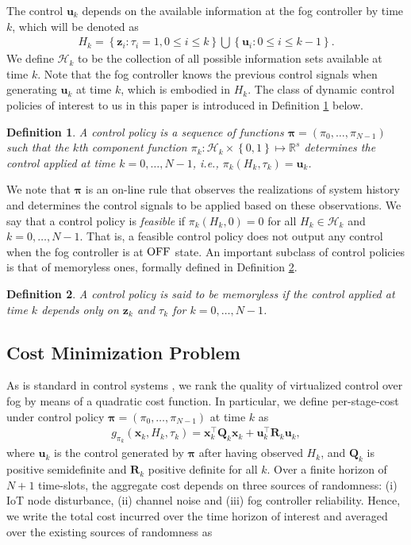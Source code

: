 \documentclass[10pt, journal, letterpaper]{IEEEtran}
\newcommand{\paren}[1]{\left(#1\right)}
\newcommand{\brparen}[1]{\left\{#1\right\}}
\newcommand{\field}[1]{\ensuremath{\mathbb{#1}}}
\newcommand{\R}{\ensuremath{\field{R}}} %
\newcommand{\1}{\ensuremath{\mathbf{1}}} %
\newcommand{\off}{\ensuremath{{\rm OFF}}}
\newcommand{\hist}{\ensuremath{{\mathcal{H}}}}
\renewcommand{\vec}[1]{\ensuremath{\boldsymbol{#1}}} %
\newtheorem{definition}{Definition}
\begin{document}
The control $\vec{u}_k$ depends on the available information at the fog controller by time $k$, which will be denoted as
\begin{eqnarray}
H_k = \brparen{\vec{z}_i: \tau_i = 1,  0 \leq i \leq k} \bigcup \brparen{\vec{u}_i: 0 \leq i \leq k-1}. \label{Eqn: System History}
\end{eqnarray}
We define $\hist_k$ to be the collection of all possible information sets available at time $k$. Note that the fog controller knows the previous control signals when generating $\vec{u}_k$ at time $k$, which is embodied in $H_k$. The class of dynamic control policies of interest to us in this paper is introduced in Definition \ref{Def: Control Policy} below.
\begin{definition} \label{Def: Control Policy}
A control policy is a sequence of functions $\vec{\pi} = \paren{\pi_0, \ldots, \pi_{N-1}}$ such that the $k$th component function $\pi_k: \hist_k \times \brparen{0, 1} \mapsto \R^s$ determines the control applied at time $k = 0, \ldots, N-1$, i.e., $\pi_k\paren{H_k, \tau_k} = \vec{u}_k$.
\end{definition}

We note that $\vec{\pi}$ is an on-line rule that observes the realizations of system history and determines the control signals to be applied based on these observations. We say that a control policy is {\em feasible} if $\pi_k\paren{H_k, 0} = 0$ for all $H_k \in \hist_k$ and $k=0, \ldots, N-1$.  That is, a feasible control policy does not output any control when the fog controller is at $\off$ state. An important subclass of control policies is that of memoryless ones, formally defined in Definition \ref{Def: Memoryless Control}.

\begin{definition} \label{Def: Memoryless Control}
A control policy is said to be {\em memoryless} if the control applied at time $k$ depends only on $\vec{z}_k$ and $\tau_k$ for $k=0, \ldots, N-1$.
\end{definition}

\subsection{Cost Minimization Problem}
As is standard in control systems \cite{Pappas15, Gupta07, Yuksel06, Yuksel13, Tatikonda04}, we rank the quality of virtualized control over fog by means of a quadratic cost function. In particular, we define per-stage-cost under control policy $\vec{\pi} = \paren{\pi_0, \ldots, \pi_{N-1}}$ at time $k$ as
\begin{eqnarray*}
g_{\pi_k}\paren{\vec{x}_k, H_k, \tau_k} = \vec{x}_k^\top \vec{Q}_k \vec{x}_k + \vec{u}_k^\top \vec{R}_k \vec{u}_k,
\end{eqnarray*}
where $\vec{u}_k$ is the control generated by $\vec{\pi}$ after having observed $H_k$, and $\vec{Q}_k$ is positive semidefinite and $\vec{R}_k$ positive definite for all $k$. Over a finite horizon of $N+1$ time-slots, the aggregate cost depends on three sources of randomness: (i) IoT node disturbance, (ii) channel noise and (iii) fog controller reliability. Hence, we write the total cost incurred over the time horizon of interest and averaged over the existing sources of randomness as
\end{document}
